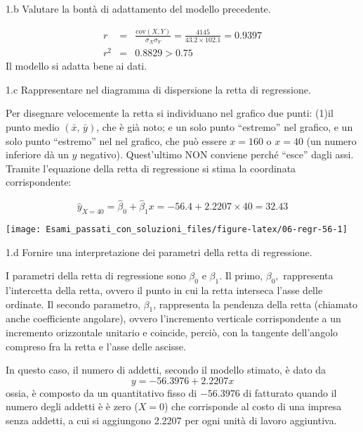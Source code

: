 \documentclass[
  11pt,
]{book}
\theoremstyle{mytheoremstyle}
\theoremstyle{mydefstyle}
\newenvironment{sol}
  {
  \begin{tcolorbox}[enhanced,breakable,arc=0.1mm,boxrule=1pt,colback=white,colframe=iblue,
  title=\bf \fontfamily{lmss}\selectfont \hspace{.5 cm} Soluzione,drop fuzzy shadow]

}{
\end{tcolorbox}
  }
\begin{document}
1.b Valutare la bontà di adattamento del modello precedente.

\begin{sol}
\begin{eqnarray*}
r&=&\frac{\text{cov}(X,Y)}{\sigma_X\sigma_Y}=\frac{ 4145 }{ 43.2 \times 102.1 }= 0.9397 \\r^2&=& 0.8829 > 0.75
\end{eqnarray*}
Il modello si adatta bene ai dati.

\end{sol}

1.c Rappresentare nel diagramma di dispersione la retta di regressione.

\begin{sol}

Per disegnare velocemente la retta si individuano nel grafico
due punti: (1)il punto medio \((\bar{x},\, \bar{y})\), che è già
noto; e un solo punto ``estremo'' nel grafico, e un solo punto ``estremo'' nel
nel grafico, che può essere \(x=160\)
o \(x=40\) (un numero inferiore dà un \(y\) negativo).
Quest'ultimo NON conviene perché ``esce'' dagli assi.
Tramite l'equazione della retta di regressione si stima la coordinata
corrispondente:

\[\hat y_{X= 40 }=\hat\beta_0+\hat\beta_1 x= -56.4 + 2.2207 \times 40 = 32.43 \]

\begin{center}\texttt{[image: Esami\_passati\_con\_soluzioni\_files/figure-latex/06-regr-56-1]} \end{center}

\end{sol}

1.d Fornire una interpretazione dei parametri della retta di regressione.

\begin{sol}
I parametri della retta di regressione sono \(\beta_{0}\) e \(\beta_{1}\).
Il primo, \(\beta_{0},\) rappresenta l'intercetta della retta,
ovvero il punto in cui la retta interseca l'asse delle ordinate.
Il secondo parametro, \(\beta_{1}\), rappresenta la pendenza della
retta (chiamato anche coefficiente angolare), ovvero l'incremento
verticale corrispondente a un incremento orizzontale unitario e
coincide, perciò, con la tangente dell'angolo compreso fra la
retta e l'asse delle ascisse.

In questo caso, il numero di addetti, secondo il modello stimato,
è dato da
\[y= -56.3976 + 2.2207 x\]
ossia, è composto da un quantitativo fisso di \(-56.3976\)
di fatturato quando il numero degli addetti è è zero (\(X=0\))
che corrisponde al costo di una impresa senza addetti, a cui
si aggiungono 2.2207 per ogni unità di lavoro aggiuntiva.

\end{sol}
\end{document}

